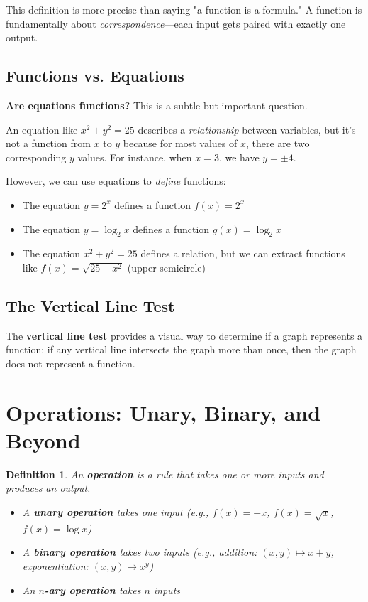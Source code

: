 \documentclass[12pt]{article}
\newtheorem{definition}{Definition}
\begin{document}
This definition is more precise than saying "a function is a formula." A function is fundamentally about \textit{correspondence}—each input gets paired with exactly one output.

\subsection{Functions vs. Equations}

\textbf{Are equations functions?} This is a subtle but important question.

An equation like $x^2 + y^2 = 25$ describes a \textit{relationship} between variables, but it's not a function from $x$ to $y$ because for most values of $x$, there are two corresponding $y$ values. For instance, when $x = 3$, we have $y = \pm 4$.

However, we can use equations to \textit{define} functions:
\begin{itemize}
\item The equation $y = 2^x$ defines a function $f(x) = 2^x$
\item The equation $y = \log_2 x$ defines a function $g(x) = \log_2 x$
\item The equation $x^2 + y^2 = 25$ defines a relation, but we can extract functions like $f(x) = \sqrt{25 - x^2}$ (upper semicircle)
\end{itemize}

\subsection{The Vertical Line Test}

The \textbf{vertical line test} provides a visual way to determine if a graph represents a function: if any vertical line intersects the graph more than once, then the graph does not represent a function.

\section{Operations: Unary, Binary, and Beyond}

\begin{definition}
An \textbf{operation} is a rule that takes one or more inputs and produces an output.

\begin{itemize}
\item A \textbf{unary operation} takes one input (e.g., $f(x) = -x$, $f(x) = \sqrt{x}$, $f(x) = \log x$)
\item A \textbf{binary operation} takes two inputs (e.g., addition: $(x,y) \mapsto x + y$, exponentiation: $(x,y) \mapsto x^y$)
\item An \textbf{$n$-ary operation} takes $n$ inputs
\end{itemize}
\end{definition}
\end{document}
